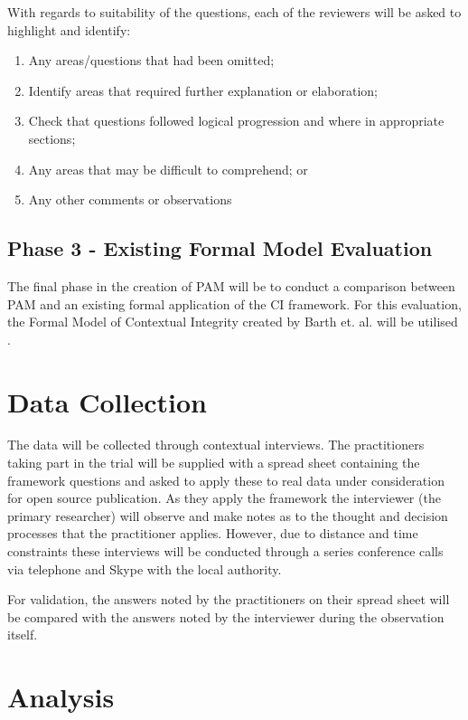 With regards to suitability of the questions, each of the reviewers will be asked to highlight and identify:

\begin{enumerate}
\item Any areas/questions that had been omitted;
\item Identify areas that required further explanation or elaboration;
\item Check that questions followed logical progression and where in appropriate sections;
\item Any areas that may be difficult to comprehend; or
\item Any other comments or observations
\end{enumerate}

\subsection{Phase 3 - Existing Formal Model Evaluation}

The final phase in the creation of PAM will be to conduct a comparison between PAM and an existing formal application of the CI framework. For this evaluation, the Formal Model of Contextual Integrity created by  Barth et. al. will be utilised \citep{Barth2006184}.

\section {Data Collection}

The data will be collected through contextual interviews. %
The practitioners taking part in the trial will be supplied with a spread sheet containing the framework questions and asked to apply these to real data under consideration for open source publication. As they apply the framework the interviewer (the primary researcher) will observe and make notes as to the thought and decision processes that the practitioner applies. However, due to distance and time constraints these interviews will be conducted through a series conference calls via telephone and Skype  with the local authority. %

For validation, the answers noted by the practitioners on their spread sheet will be compared with the answers noted by the interviewer during the observation itself.

\section {Analysis}

